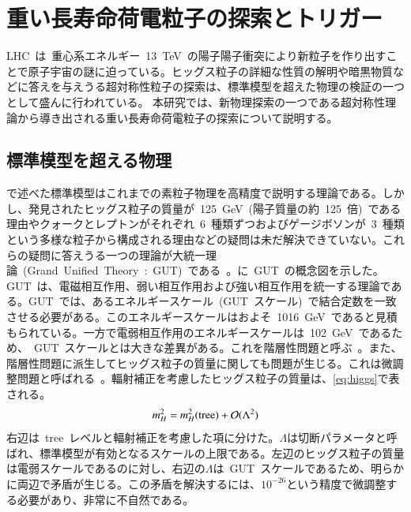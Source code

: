 \chapter{重い長寿命荷電粒子の探索とトリガー}
\thispagestyle{empty}
\label{chap:3}
LHC~は~重心系エネルギー~13~TeV~の陽子陽子衝突により新粒子を作り出すことで原子宇宙の謎に迫っている。ヒッグス粒子の詳細な性質の解明や暗黒物質などに答えを与えうる超対称性粒子の探索は、標準模型を超えた物理の検証の一つとして盛んに行われている。
本研究では、新物理探索の一つである超対称性理論から導き出される重い長寿命荷電粒子の探索について説明する。

\section{標準模型を超える物理}
\label{sec:BSM}
で述べた標準模型はこれまでの素粒子物理を高精度で説明する理論である。しかし、発見されたヒッグス粒子の質量が~125~GeV~(陽子質量の約~125~倍)~である理由やクォークとレプトンがそれぞれ~6~種類ずつおよびゲージボソンが~3~種類という多様な粒子から構成される理由などの疑問は未だ解決できていない。これらの疑問に答えうる一つの理論が大統一理論~(Grand~Unified~Theory~:~GUT)~である~\cite{AR:10}。に~GUT~の概念図を示した。GUT~は、電磁相互作用、弱い相互作用および強い相互作用を統一する理論である。GUT~では、あるエネルギースケール~(GUT~スケール)~で結合定数を一致させる必要がある。このエネルギースケールはおよそ~1016~GeV~であると見積もられている。一方で電弱相互作用のエネルギースケールは~102~GeV~であるため、~GUT~スケールとは大きな差異がある。これを階層性問題と呼ぶ~\cite{AR:06}。また、階層性問題に派生してヒッグス粒子の質量に関しても問題が生じる。これは微調整問題と呼ばれる~\cite{AR:06}。輻射補正を考慮したヒッグス粒子の質量は、\eqref{eq:higgs}で表される。
\begin{align}
    m_{H}^2=m_{H}^2(\rm{tree})+\mathcal{O}(\Lambda^2) \label{eq:higgs}
\end{align}
右辺は~tree~レベルと輻射補正を考慮した項に分けた。$\Lambda$は切断パラメータと呼ばれ、標準模型が有効となるスケールの上限である。左辺のヒッグス粒子の質量は電弱スケールであるのに対し、右辺の$\Lambda$は~GUT~スケールであるため、明らかに両辺で矛盾が生じる。この矛盾を解決するには、$10^{-26}$という精度で微調整する必要があり、非常に不自然である。

